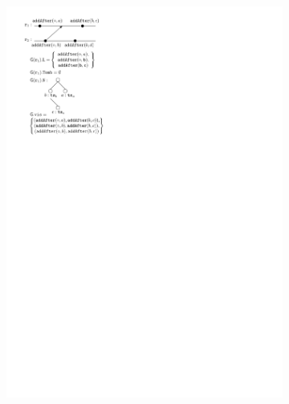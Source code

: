 \begin{figure}[t]
  \begin{subfigure}[!ht]{.3\linewidth}
    \includegraphics[scale=.7]{figures/LinRGA-1}
      \vspace{1.3cm}
    \caption{}
    \label{fig:rga-sem-1}
  \end{subfigure}
  \begin{subfigure}[!ht]{.3\linewidth}

\end{subfigure}
\end{figure}
